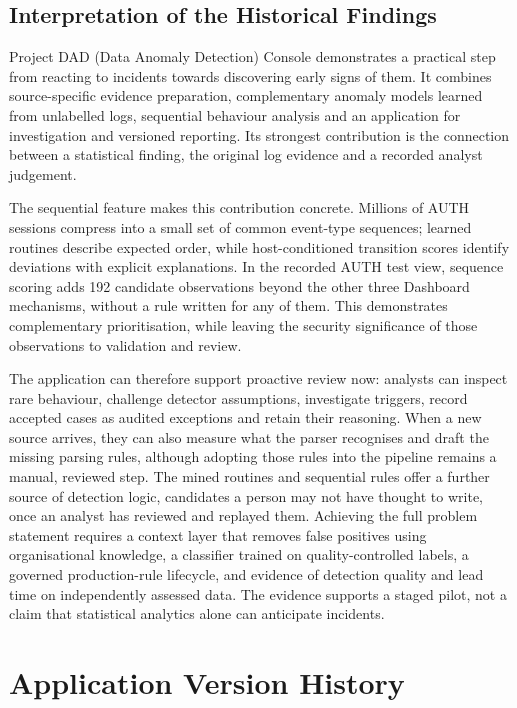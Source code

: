 \documentclass[11pt,a4paper]{article}
\begin{document}
\subsection{Interpretation of the Historical Findings}

Project DAD (Data Anomaly Detection) Console demonstrates a practical step from reacting to incidents towards discovering early signs of them. It combines source-specific evidence preparation, complementary anomaly models learned from unlabelled logs, sequential behaviour analysis and an application for investigation and versioned reporting. Its strongest contribution is the connection between a statistical finding, the original log evidence and a recorded analyst judgement.

The sequential feature makes this contribution concrete. Millions of AUTH sessions compress into a small set of common event-type sequences; learned routines describe expected order, while host-conditioned transition scores identify deviations with explicit explanations. In the recorded AUTH test view, sequence scoring adds 192 candidate observations beyond the other three Dashboard mechanisms, without a rule written for any of them. This demonstrates complementary prioritisation, while leaving the security significance of those observations to validation and review.

The application can therefore support proactive review now: analysts can inspect rare behaviour, challenge detector assumptions, investigate triggers, record accepted cases as audited exceptions and retain their reasoning. When a new source arrives, they can also measure what the parser recognises and draft the missing parsing rules, although adopting those rules into the pipeline remains a manual, reviewed step. The mined routines and sequential rules offer a further source of detection logic, candidates a person may not have thought to write, once an analyst has reviewed and replayed them. Achieving the full problem statement requires a context layer that removes false positives using organisational knowledge, a classifier trained on quality-controlled labels, a governed production-rule lifecycle, and evidence of detection quality and lead time on independently assessed data. The evidence supports a staged pilot, not a claim that statistical analytics alone can anticipate incidents.

\clearpage
\section{Application Version History}
\label{app:versions}
\end{document}
